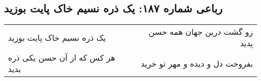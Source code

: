 \begin{center}
\section*{رباعی شماره ۱۸۷: یک ذره نسیم خاک پایت بوزید}
\label{sec:sh187}
\begin{longtable}{l p{0.5cm} r}
یک ذره نسیم خاک پایت بوزید
&&
زو گشت درین جهان همه حسن پدید
\\
هر کس که از آن حسن یکی ذره بدید
&&
بفروخت دل و دیده و مهر تو خرید
\\
\end{longtable}
\end{center}
